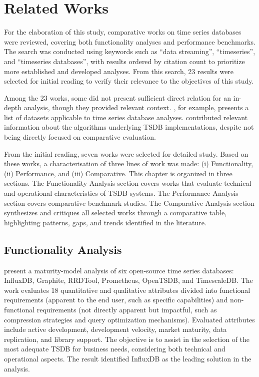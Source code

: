 \section{Related Works}
\label{sec:related}

For the elaboration of this study, comparative works on time series databases were reviewed,
covering both functionality analyses and performance benchmarks. The search was conducted
using keywords such as ``data streaming'', ``timeseries'', and ``timeseries databases'',
with results ordered by citation count to prioritize more established and developed analyses.
From this search, 23 results were selected for initial reading to verify their relevance to
the objectives of this study.

Among the 23 works, some did not present sufficient direct relation for an in-depth analysis,
though they provided relevant context. \cite{zubaroglu2021data}, for example, presents a list
of datasets applicable to time series database analyses. \cite{Gaber2005Mining} contributed
relevant information about the algorithms underlying TSDB implementations, despite not being
directly focused on comparative evaluation.

From the initial reading, seven works were selected for detailed study. Based on these works, a characterisation of three lines of work was made: (i) Functionality, (ii) Performance, and (iii) Comparative. This chapter is organized
in three sections. The Functionality Analysis section covers works that evaluate
technical and operational characteristics of TSDB systems. The Performance Analysis
section covers comparative benchmark studies. The Comparative Analysis
section synthesizes and critiques all selected works through a comparative table, highlighting patterns,
gaps, and trends identified in the literature.

\subsection{Functionality Analysis}

\cite{Petre2019} present a maturity-model analysis of six open-source time series databases:
InfluxDB, Graphite, RRDTool, Prometheus, OpenTSDB, and TimescaleDB. The work evaluates 18
quantitative and qualitative attributes divided into functional requirements (apparent to the
end user, such as specific capabilities) and non-functional requirements (not directly
apparent but impactful, such as compression strategies and query optimization mechanisms).
Evaluated attributes include active development, development velocity, market maturity, data
replication, and library support. The objective is to assist in the selection of the most
adequate TSDB for business needs, considering both technical and operational aspects. The
result identified InfluxDB as the leading solution in the analysis.

